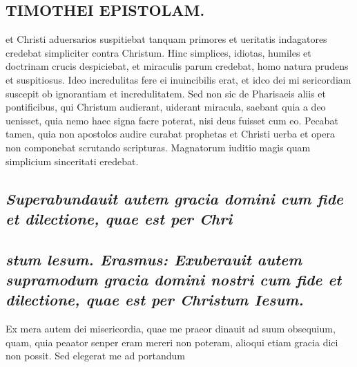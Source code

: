\documentclass{article}
\begin{document}
\begin{pages}
\section*{TIMOTHEI EPISTOLAM. }
\marginpar{[ p.29 ]}\pstart et Christi aduersarios suspitiebat tanquam primores et ueritatis indagatores credebat simpliciter contra Christum. Hinc simplices, idiotas, humiles et doctrinam crucis despiciebat, et miraculis parum credebat, homo natura prudens et suspitiosus. Ideo incredulitas fere ei inuincibilis erat, et idco dei mi sericordiam suscepit ob ignorantiam et incredulitatem. Sed non sic de Pharisaeis aliis et pontificibus, qui Christum audierant, uiderant miracula, saebant quia a deo uenisset, quia nemo haec signa facre poterat, nisi deus fuisset cum eo.  \pend\pstart Pecabat tamen, quia non apostolos audire curabat prophetas et Christi uerba et opera non componebat scrutando scripturas. Magnatorum iuditio magis quam simplicium sinceritati eredebat.  \pend
{}
{}
\subsection*{\textit{Superabundauit autem gracia domini cum fide et dilectione, quae est per Chri}}
{}
\subsection*{\textit{stum lesum. Erasmus: Exuberauit autem supramodum gracia domini nostri cum fide et dilectione, quae est per Christum Iesum. }}\pstart Ex mera autem dei misericordia, quae me praeor dinauit ad suum obsequium, quam, quia peaator senper eram mereri non poteram, alioqui etiam gracia dici non possit. Sed elegerat me ad portandum  \pend

\end{pages}
\end{document}
